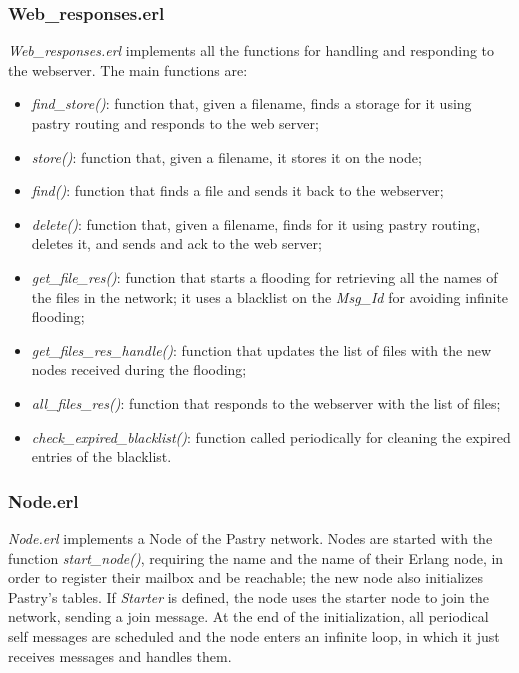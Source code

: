 \documentclass{article}
\begin{document}
\subsubsection{Web\_responses.erl}

\textit{Web\_responses.erl} implements all the functions for handling and responding to the webserver.
The main functions are:

\begin{itemize}
    \item \textit{find\_store()}: function that, given a filename, finds a storage for it using pastry routing and responds
    to the web server;
    \item \textit{store()}: function that, given a filename, it stores it on the node;
    \item \textit{find()}: function that finds a file and sends it back to the webserver;
    \item \textit{delete()}: function that, given a filename, finds for it using pastry routing, deletes it,
    and sends and ack to the web server;
    \item \textit{get\_file\_res()}: function that starts a flooding for retrieving all the names of the files
    in the network; it uses a blacklist on the \textit{Msg\_Id} for avoiding infinite flooding; 
    \item \textit{get\_files\_res\_handle()}: function that updates the list of files with the new nodes received during the flooding;
    \item \textit{all\_files\_res()}: function that responds to the webserver with the list of files;
    \item \textit{check\_expired\_blacklist()}: function called periodically for cleaning the expired entries of the blacklist.
\end{itemize}



\subsubsection{Node.erl}

\textit{Node.erl} implements a Node of the Pastry network. Nodes are started with the function \textit{start\_node()}, requiring the name
and the name of their Erlang node, in order to register their mailbox and be reachable; the new node also initializes Pastry's tables.
If \textit{Starter} is defined, the node uses the starter node to join the network, sending a join message.
At the end of the initialization, all periodical self messages are scheduled and the node enters an infinite loop, in which it just receives
messages and handles them.
\end{document}
